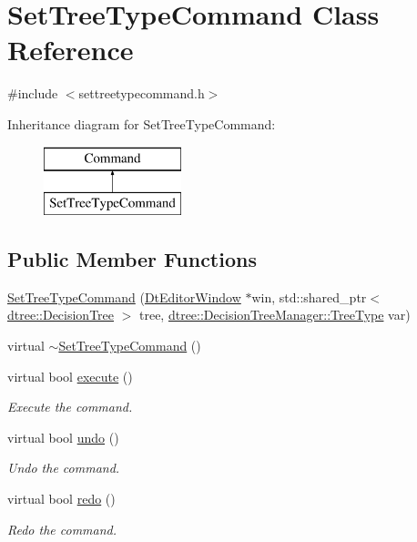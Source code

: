 \hypertarget{class_set_tree_type_command}{}\section{Set\+Tree\+Type\+Command Class Reference}
\label{class_set_tree_type_command}


{\ttfamily \#include $<$settreetypecommand.\+h$>$}

Inheritance diagram for Set\+Tree\+Type\+Command\+:\begin{figure}[H]
\begin{center}
\leavevmode
\includegraphics[height=2.000000cm]{d2/d94/class_set_tree_type_command}
\end{center}
\end{figure}
\subsection*{Public Member Functions}
\begin{DoxyCompactItemize}
\item 
\mbox{\hyperlink{class_set_tree_type_command_a0451d9a9db5db51b504720fcd5821f2a}{Set\+Tree\+Type\+Command}} (\mbox{\hyperlink{class_dt_editor_window}{Dt\+Editor\+Window}} $\ast$win, std\+::shared\+\_\+ptr$<$ \mbox{\hyperlink{classdtree_1_1_decision_tree}{dtree\+::\+Decision\+Tree}} $>$ tree, \mbox{\hyperlink{classdtree_1_1_decision_tree_manager_a14180eb59d2c245ce3af1c27ddb0846d}{dtree\+::\+Decision\+Tree\+Manager\+::\+Tree\+Type}} var)
\item 
virtual \mbox{\hyperlink{class_set_tree_type_command_ad16e3c8044c133c632f27921d18d2dbf}{$\sim$\+Set\+Tree\+Type\+Command}} ()
\item 
virtual bool \mbox{\hyperlink{class_set_tree_type_command_af11ff06bfd5b1068828ba3d1702d291e}{execute}} ()
\begin{DoxyCompactList}\small\item\em Execute the command. \end{DoxyCompactList}\item 
virtual bool \mbox{\hyperlink{class_set_tree_type_command_ac6538d32b00404cfca61d6f28bf7b854}{undo}} ()
\begin{DoxyCompactList}\small\item\em Undo the command. \end{DoxyCompactList}\item 
virtual bool \mbox{\hyperlink{class_set_tree_type_command_a16b5d34a58f58a5daad23f8c32fc14b4}{redo}} ()
\begin{DoxyCompactList}\small\item\em Redo the command. \end{DoxyCompactList}\end{DoxyCompactItemize}


